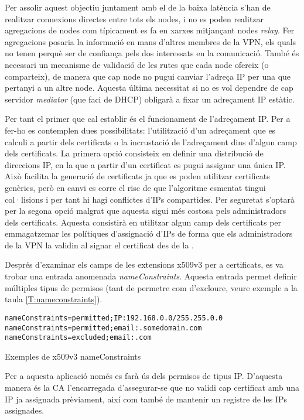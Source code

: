 Per assolir aquest objectiu juntament amb el de la baixa latència s'han de realitzar connexions directes entre tots els nodes, i no es poden realitzar agregacions de nodes com típicament es fa en xarxes  mitjançant nodes \emph{relay}. Fer agregacions posaria la informació en mans d'altres membres de la VPN, els quals no tenen perquè ser de confiança pels dos interessats en la comunicació. També és necessari un mecanisme de validació de les rutes que cada node ofereix (o comparteix), de manera que cap node no pugui canviar l'adreça IP per una que pertanyi a un altre node. Aquesta última necessitat si no es vol dependre de cap servidor \emph{mediator} (que faci de DHCP) obligarà a fixar un adreçament IP estàtic.

Per tant el primer que cal establir és el funcionament de l'adreçament IP. Per a fer-ho es contemplen dues possibilitats: l'utilització d'un adreçament que es calculi a partir dels certificats o la incrustació de l'adreçament dins d'algun camp dels certificats.
La primera opció consisteix en definir una distribució de direccions IP, en la que a partir d'un certificat es pugui assignar una única IP. Això facilita la generació de certificats ja que es poden utilitzar certificats genèrics, però en canvi es corre el risc de que l'algoritme esmentat tingui col·lisions i per tant hi hagi conflictes d'IPs compartides. Per seguretat s'optarà per la segona opció malgrat que aquesta sigui més costosa pels administradors dels certificats. Aquesta consistirà en utilitzar algun camp dels certificats per emmagatzemar les polítiques d'assignació d'IPs de forma que els administradors de la VPN la validin al signar el certificat des de la .

Després d'examinar els camps de les extensions x509v3 per a certificats, es va trobar una entrada anomenada \emph{nameConstraints}. Aquesta entrada permet definir múltiples tipus de permisos (tant de permetre com d'excloure, veure exemple a la taula \ref{T:nameconstraints}).
\begin{table}[htb]
\begin{center}
\begin{minipage}[htb]{0.6\linewidth}
\footnotesize
\begin{verbatim}
nameConstraints=permitted;IP:192.168.0.0/255.255.0.0
nameConstraints=permitted;email:.somedomain.com
nameConstraints=excluded;email:.com
\end{verbatim}
\end{minipage}
\caption{Exemples de x509v3 nameConstraints}
\label{T:nameconstraints}
\end{center}
\end{table}
Per a aquesta aplicació només es farà ús dels permisos de tipus IP. D'aquesta manera és la CA l'encarregada d'assegurar-se que no validi cap certificat amb una IP ja assignada prèviament, així com també de mantenir un registre de les IPs assignades.

